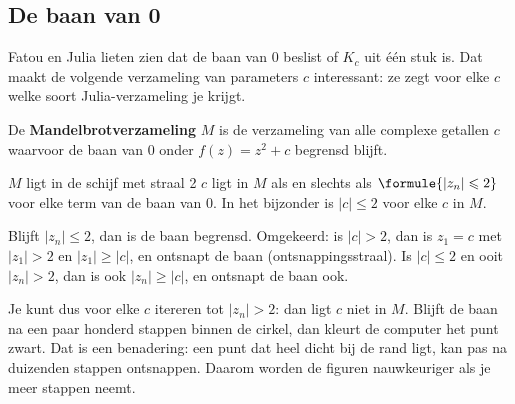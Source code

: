 \subsection{De baan van 0}

Fatou en Julia lieten zien dat de baan van 0 beslist of $K_c$ uit één stuk is. Dat maakt de volgende verzameling van parameters $c$ interessant: ze zegt voor elke $c$ welke soort Julia-verzameling je krijgt.

\begin{theorie}
De \textbf{\textcolor{accent}{Mandelbrotverzameling}} $M$ is de verzameling van alle complexe getallen $c$ waarvoor de baan van 0 onder $f(z) = z^2 + c$ begrensd blijft.

\begin{stelling}{$M$ ligt in de schijf met straal 2}
$c$ ligt in $M$ als en slechts als $\formule{|z_n| \leqslant 2}$ voor elke term van de baan van 0. In het bijzonder is $|c| \leqslant 2$ voor elke $c$ in $M$.
\end{stelling}

\begin{bewijs}
Blijft $|z_n| \leqslant 2$, dan is de baan begrensd. Omgekeerd: is $|c| > 2$, dan is $z_1 = c$ met $|z_1| > 2$ en $|z_1| \geqslant |c|$, en ontsnapt de baan (ontsnappingsstraal). Is $|c| \leqslant 2$ en ooit $|z_n| > 2$, dan is ook $|z_n| \geqslant |c|$, en ontsnapt de baan ook.
\end{bewijs}
\end{theorie}

Je kunt dus voor elke $c$ itereren tot $|z_n| > 2$: dan ligt $c$ niet in $M$. Blijft de baan na een paar honderd stappen binnen de cirkel, dan kleurt de computer het punt zwart. Dat is een benadering: een punt dat heel dicht bij de rand ligt, kan pas na duizenden stappen ontsnappen. Daarom worden de figuren nauwkeuriger als je meer stappen neemt.


